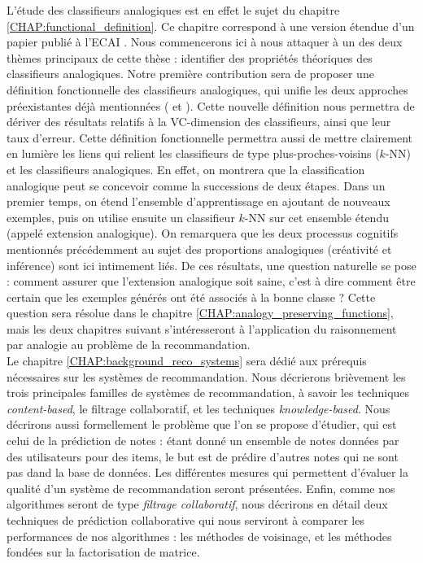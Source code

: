 L'étude des classifieurs analogiques est en effet le sujet du chapitre
\ref{CHAP:functional_definition}. Ce chapitre correspond à une version étendue
d'un papier publié à l'ECAI \cite{HugPraRicSerECAI16}. Nous commencerons ici à
nous attaquer à un des deux thèmes principaux de cette thèse : identifier des
propriétés théoriques des classifieurs analogiques. Notre première contribution
sera de proposer une définition fonctionnelle des classifieurs analogiques, qui
unifie les deux approches préexistantes déjà mentionnées (\cite{StrYvoCNLL05}
et \cite{BayMicDelIJCAI07}). Cette nouvelle définition nous permettra de
dériver des résultats relatifs à la VC-dimension des classifieurs, ainsi que
leur taux d'erreur. Cette définition fonctionnelle permettra aussi de mettre
clairement en lumière les liens qui relient les classifieurs de type
plus-proches-voisins ($k$-NN) et les classifieurs analogiques. En effet, on
montrera que la classification analogique peut se concevoir comme la
successions de deux étapes. Dans un premier temps, on étend l'ensemble
d'apprentissage  en ajoutant de nouveaux exemples, puis on utilise ensuite un
classifieur $k$-NN sur cet ensemble étendu (appelé extension analogique). On
remarquera que les deux processus cognitifs mentionnés précédemment au
sujet des proportions analogiques (créativité et inférence) sont ici intimement
liés. De ces résultats, une question naturelle se pose : comment assurer que
l'extension analogique soit saine, c'est à dire comment être certain que les
exemples générés ont été associés à la bonne classe ? Cette question sera
résolue dans le chapitre \ref{CHAP:analogy_preserving_functions}, mais les deux
chapitres suivant s'intéresseront à l'application du raisonnement par analogie
au problème de la recommandation.\\


Le chapitre  \ref{CHAP:background_reco_systems} sera dédié aux prérequis
nécessaires sur les systèmes de recommandation. Nous décrierons brièvement les
trois principales familles de systèmes de recommandation, à savoir les
techniques \textit{content-based}, le filtrage collaboratif, et les techniques
\textit{knowledge-based}. Nous décrirons aussi formellement le problème que
l'on se propose d'étudier, qui est celui de la prédiction de notes : étant
donné un ensemble de notes données par des utilisateurs pour des items, le but
est de prédire d'autres notes qui ne sont pas dand la base de données. Les
différentes mesures qui permettent d'évaluer la qualité d'un système de
recommandation seront présentées. Enfin, comme nos algorithmes seront de type
\textit{filtrage collaboratif}, nous décrirons en détail deux techniques de
prédiction collaborative qui nous serviront à comparer les performances de nos
algorithmes : les méthodes de voisinage, et les méthodes fondées sur la
factorisation de matrice.\\


